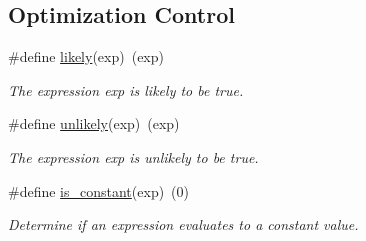 \subsection*{Optimization Control}
\begin{DoxyCompactItemize}
\item 
\#define \mbox{\hyperlink{group__group__sam0__utils_gac082df2dd9a1024f6e8d16a61855d989}{likely}}(exp)~(exp)
\begin{DoxyCompactList}\small\item\em The expression {\itshape exp} is likely to be true. \end{DoxyCompactList}\item 
\#define \mbox{\hyperlink{group__group__sam0__utils_ga1c0c89beb84d05c5ba0bc7ce527a3925}{unlikely}}(exp)~(exp)
\begin{DoxyCompactList}\small\item\em The expression {\itshape exp} is unlikely to be true. \end{DoxyCompactList}\item 
\#define \mbox{\hyperlink{group__group__sam0__utils_ga15892ad6884af110e5eaaa96994ebaa9}{is\+\_\+constant}}(exp)~(0)
\begin{DoxyCompactList}\small\item\em Determine if an expression evaluates to a constant value. \end{DoxyCompactList}\end{DoxyCompactItemize}
